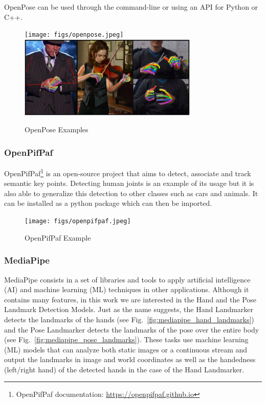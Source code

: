OpenPose can be used through the command-line or using an API for Python or C++.

\begin{figure}[!ht]
\centerline{\texttt{[image: figs/openpose.jpeg]}\includegraphics[height=1.55in]{figs/openpose2.PNG}}
\caption[OpenPose Examples]{OpenPose Examples \cite{Cao2021,Simon2017}}
\label{openpose}
\end{figure}

\subsubsection{OpenPifPaf}

OpenPifPaf\cite{Kreiss2021,Kreiss2019}\footnote{OpenPifPaf documentation: \url{https://openpifpaf.github.io}} is an open-source project that aims to detect, associate and track semantic key points. Detecting human joints is an example of its usage but it is also able to generalize this detection to other classes such as cars and animals. It can be installed as a python package which can then be imported.

\begin{figure}[!ht]
\centerline{\texttt{[image: figs/openpifpaf.jpeg]}}
\caption[OpenPifPaf Example]{OpenPifPaf Example \cite{Kreiss2021}}
\label{openpifpaf}
\end{figure}

\subsubsection{MediaPipe}

MediaPipe consists in a set of libraries and tools to apply artificial intelligence (AI) and machine learning (ML) techniques in other applications. Although it contains many features, in this work we are interested in the Hand and the Pose Landmark Detection Models. Just as the name suggests, the Hand Landmarker detects the landmarks of the hands (see Fig.~\ref{fig:mediapipe_hand_landmarks}) and the Pose Landmarker detects the landmarks of the pose over the entire body (see Fig.~\ref{fig:mediapipe_pose_landmarks}). These tasks use machine learning (ML) models that can analyze both static images or a continuous stream and output the landmarks in image and world coordinates as well as the handedness (left/right hand) of the detected hands in the case of the Hand Landmarker.

